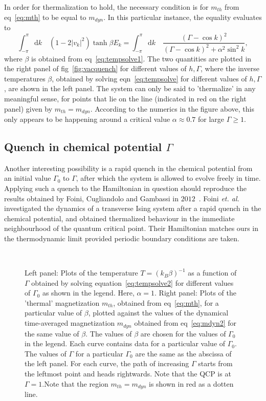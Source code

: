 \documentclass[a4paper,10pt]{article}
\begin{document}
In order for thermalization to hold, the necessary condition is for $m_{th}$ from eq~\ref{eq:mth} to be equal to $m_{dyn}$. In this particular instance, the equality evaluates to
\begin{equation}
\int^\pi_{-\pi}\mathrm{d}k\quad \left(1-2|v_k|^2\right)\tanh{\beta E_k} = \int^\pi_{-\pi}\mathrm{d}k\quad \frac{(\Gamma -\cos{k})^2}{\left(\Gamma-\cos{k}\right)^2+\alpha ^2 \sin^2{k}},
\end{equation}
where $\beta$ is obtained from eq~\ref{eq:tempsolve1}. The two quantities are plotted in the right panel of fig~\ref{fig:vacquench} for different values of $h,\Gamma$, where the inverse temperatures $\beta$, obtained by solving eqn~\ref{eq:tempsolve} for different values of $h,\Gamma$, are shown in the left panel. The system can only be said to 'thermalize' in any meaningful sense, for points that lie on the line (indicated in red on the right panel) given by $m_{th}=m_{dyn}$. According to the numerics in the figure above, this only appears to be happening around a critical value $\alpha\approx0.7$ for large $\Gamma\geq 1$.

\subsection{Quench in chemical potential $\Gamma$}
Another interesting possibility is a rapid quench in the chemical potential from an initial value $\Gamma_0$ to $\Gamma$, after which the system is allowed to evolve freely in time. Applying such a quench to the Hamiltonian in question should reproduce
the results obtained by Foini, Cugliandolo and Gambassi in $2012$~\cite{leticia}. Foini \textit{et. al.} investigated the dynamics of a transverse Ising system after a rapid quench in the chemical potential, and obtained thermalized behaviour in the immediate neighbourhood of the quantum critical point. Their Hamiltonian matches ours in the thermodynamic limit provided periodic boundary conditions are taken.

\begin{figure}[h!bt]
\ 
\caption{Left panel: Plots of the temperature $T=(k_B\beta)^{-1}$ as a function of $\Gamma$ obtained by solving equation~\ref{eq:tempsolve2} for different values of $\Gamma_0$ as shown in the legend. Here, $\alpha=1$. Right panel: Plots of the 'thermal' magnetization $m_{th}$, obtained from eq~\ref{eq:mth}, for a particular value of $\beta$, plotted against the values of the dynamical time-averaged magnetization $m_{dyn}$ obtained from eq~\ref{eq:mdyn2} for the same value of $\beta$. The values of $\beta$ are chosen for the values of $\Gamma_0$ in the legend. Each curve contains data for a particular value of $\Gamma_0$. The values of $\Gamma$ for a particular $\Gamma_0$ are the same as the abscissa of the left panel. For each curve, the path of increasing $\Gamma$ starts from the leftmost point and heads rightwards. Note that the QCP is at $\Gamma=1$.Note that the region $m_{th}=m_{dyn}$ is shown in red as a dotten line.}
\label{fig:chempotquench}
\end{figure}
\end{document}

